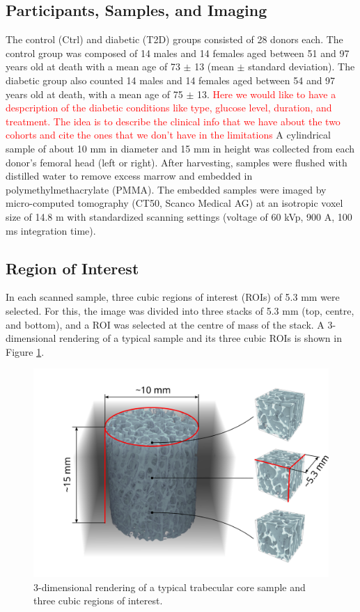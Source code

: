 \documentclass[a4paper,fleqn]{DC_ArtStyle}
\begin{document}
	\subsection{Participants, Samples, and Imaging}
	The control (Ctrl) and diabetic (T2D) groups consisted of 28 donors each.
	The control group was composed of 14 males and 14 females aged between 51 and 97 years old at death with a mean age of 73 $\pm$ 13 (mean $\pm$ standard deviation).
	The diabetic group also counted 14 males and 14 females aged between 54 and 97 years old at death, with a mean age of 75 $\pm$ 13.
	\textcolor{red}{Here we would like to have a despcription of the diabetic conditions like type, glucose level, duration, and treatment.
	The idea is to describe the clinical info that we have about the two cohorts and cite the ones that we don't have in the limitations}
	A cylindrical sample of about 10 mm in diameter and 15 mm in height was collected from each donor's femoral head (left or right).
	After harvesting, samples were flushed with distilled water to remove excess marrow and embedded in polymethylmethacrylate (PMMA).
	The embedded samples were imaged by micro-computed tomography (\textmu CT50, Scanco Medical AG) at an isotropic voxel size of 14.8 \textmu m with standardized scanning settings (voltage of 60 kVp, 900 \textmu A, 100 ms integration time).
   
	\subsection{Region of Interest}
	In each scanned sample, three cubic regions of interest (ROIs) of 5.3 mm were selected.
	For this, the image was divided into three stacks of 5.3 mm (top, centre, and bottom), and a ROI was selected at the centre of mass of the stack.
	A 3-dimensional rendering of a typical sample and its three cubic ROIs is shown in Figure \ref{FigSample}.
   
	\begin{figure}
		\includegraphics[width=\linewidth]{Sample}
		\caption{3-dimensional rendering of a typical trabecular core sample and three cubic regions of interest.}
		\label{FigSample}
	\end{figure}
\end{document}
